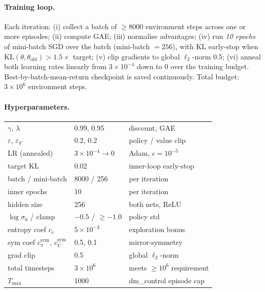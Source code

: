 \documentclass[11pt]{article}
\begin{document}
\paragraph{Training loop.} Each iteration:
(i) collect a batch of $\geq 8000$ environment steps across one or
more episodes; (ii) compute GAE; (iii) normalise advantages;
(iv) run \emph{10 epochs} of mini-batch SGD over the batch
(mini-batch $= 256$), with KL early-stop when
$\mathrm{KL}(\theta,\theta_\text{old}) > 1.5 \times$ target;
(v) clip gradients to global $\ell_2$-norm 0.5; (vi) anneal both
learning rates linearly from $3\times 10^{-4}$ down to $0$ over the
training budget. Best-by-batch-mean-return checkpoint is saved
continuously. Total budget: $3\times 10^{6}$ environment steps.

\paragraph{Hyperparameters.}
\begin{center}
\begin{tabular}{lll}
\toprule
$\gamma$, $\lambda$ & 0.99, 0.95 & discount, GAE \\
$\varepsilon$, $\varepsilon_V$ & 0.2, 0.2 & policy / value clip \\
LR (annealed) & $3\times 10^{-4} \to 0$ & Adam, $\epsilon=10^{-5}$ \\
target KL & 0.02 & inner-loop early-stop \\
batch / mini-batch & 8000 / 256 & per iteration \\
inner epochs & 10 & per iteration \\
hidden size & 256 & both nets, ReLU \\
$\log\sigma_0$ / clamp & $-0.5$ / $\geq -1.0$ & policy std \\
entropy coef $c_e$ & $5\times 10^{-3}$ & exploration bonus \\
sym coef $c_\pi^{\text{sym}}$, $c_V^{\text{sym}}$ & 0.5, 0.1 & mirror-symmetry \\
grad clip & 0.5 & global $\ell_2$-norm \\
total timesteps & $3\times 10^{6}$ & meets $\geq 10^6$ requirement \\
$T_{\max}$ & 1000 & dm\_control episode cap \\
\bottomrule
\end{tabular}
\end{center}
\end{document}
